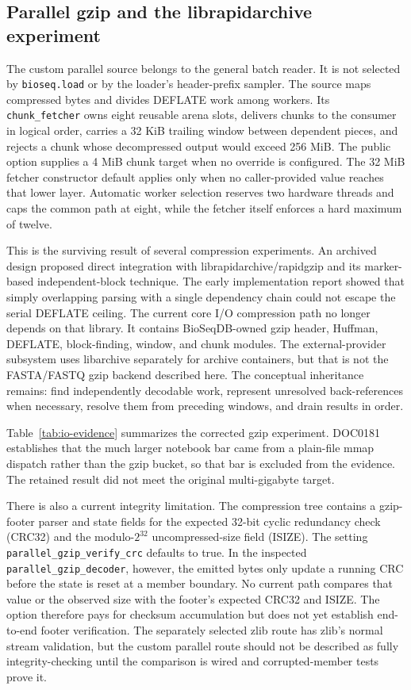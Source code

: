 \subsection{Parallel gzip and the librapidarchive experiment}

The custom parallel source belongs to the general batch reader. It is not
selected by \texttt{bioseq.load} or by the loader's header-prefix sampler. The
source maps compressed bytes and divides DEFLATE work among workers. Its
\texttt{chunk\_fetcher} owns eight reusable arena slots,
delivers chunks to the consumer in logical order, carries a 32 KiB trailing
window between dependent pieces, and rejects a chunk whose decompressed output
would exceed 256 MiB. The public option supplies a 4 MiB chunk target when no
override is configured. The 32 MiB fetcher constructor default applies only
when no caller-provided value reaches that lower layer. Automatic worker
selection reserves two hardware
threads and caps the common path at eight, while the fetcher itself enforces a
hard maximum of twelve.

This is the surviving result of several compression experiments.  An archived
design proposed direct integration with librapidarchive/rapidgzip and its
marker-based independent-block technique.  The early implementation report
showed that simply overlapping parsing with a single dependency chain could
not escape the serial DEFLATE ceiling. The current core I/O compression path
no longer depends on that library. It contains BioSeqDB-owned gzip header,
Huffman, DEFLATE, block-finding, window, and chunk modules.  The
external-provider subsystem uses libarchive separately for archive containers,
but that is not the FASTA/FASTQ gzip backend described here.  The conceptual
inheritance remains:
find independently decodable work, represent unresolved back-references when
necessary, resolve them from preceding windows, and drain results in order.

Table~\ref{tab:io-evidence} summarizes the corrected gzip experiment. DOC0181
establishes that the much larger notebook bar came from a plain-file mmap
dispatch rather than the gzip bucket, so that bar is excluded from the
evidence. The retained result did not meet the original multi-gigabyte target.

There is also a current integrity limitation. The compression tree contains a
gzip-footer parser and state fields for the expected 32-bit cyclic redundancy
check (CRC32) and the modulo-$2^{32}$ uncompressed-size field (ISIZE). The setting
\texttt{parallel\_gzip\_verify\_crc} defaults to true. In the inspected
\texttt{parallel\_gzip\_decoder}, however, the emitted bytes only update a
running CRC before the state is reset at a member boundary.  No current path
compares that value or the observed size with the footer's expected CRC32 and
ISIZE.  The option therefore pays for checksum accumulation but does not yet
establish end-to-end footer verification. The separately selected zlib route
has zlib's normal stream validation, but the custom parallel route should not
be described as fully integrity-checking until the comparison is wired and
corrupted-member tests prove it.

